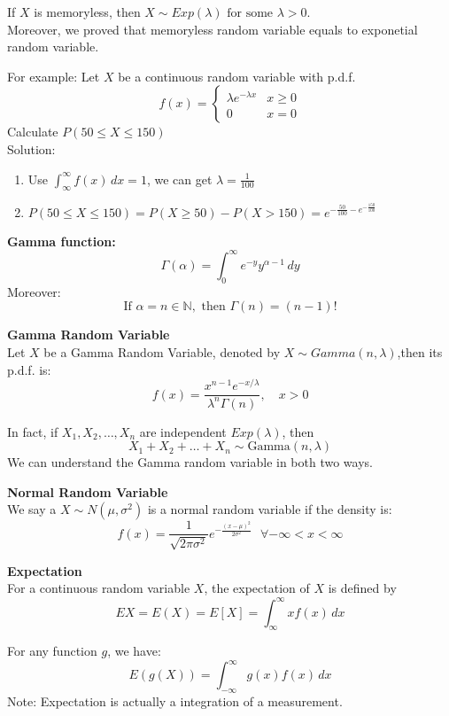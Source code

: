 \documentclass{article}
\begin{document}
\begin{theorem}
    If $X$ is memoryless, then $X \sim Exp(\lambda) \text{ for some } \lambda > 0$. \\
    Moreover, we proved that memoryless random variable equals to exponetial random variable.
\end{theorem}
For example: Let $X$ be a continuous random variable with p.d.f.
\[ 
f(x) =
\begin{cases}
    \lambda e^{-\lambda x} & x \geq 0 \\
    0 & x = 0
\end{cases}
\]
Calculate $P(50 \leq X \leq 150)$ \\
Solution:
\begin{enumerate}
    \item Use $\int^{\infty}_{\infty}f(x) \, dx = 1$, we can get $\lambda = \frac{1}{100}$
    \item $P(50 \leq X \leq 150) = P(X \geq 50) - P(X > 150) = e^{-\frac{50}{100} - e^{-\frac{150}{100}}}$
\end{enumerate}
\begin{definition}
    \textbf{Gamma function:}
    $$ \Gamma(\alpha) = \int^{\infty}_0 e^{-y}y^{\alpha-1}\, dy$$
    Moreover:
    $$ \text{If } \alpha = n \in \mathbb{N}, \text{ then } \Gamma(n) = (n-1)!$$
\end{definition}

\begin{definition}
    \textbf{Gamma Random Variable}\\
    Let $X$ be a Gamma Random Variable, denoted by $X \sim Gamma(n,\lambda)$,then its p.d.f. is:
    $$ f(x) = \frac{x^{n-1} e^{-x/\lambda}}{\lambda^n \Gamma(n)}, \quad x > 0$$
\end{definition}
In fact, if $X_1, X_2, \dots ,X_n$ are independent $Exp(\lambda)$, then
$$ X_1 + X_2 + \dots + X_n \sim \text{Gamma}(n, \lambda)$$
We can understand the Gamma random variable in both two ways.
\begin{definition}
    \textbf{Normal Random Variable}\\
    We say a $X \sim N(\mu, \sigma^2)$ is a normal random variable if the density is:
    $$ f(x) = \frac{1}{\sqrt{2\pi\sigma^2}}e^{-\frac{(x-\mu)^2}{2\sigma^2}} \textbf{ } \forall -\infty < x < \infty$$
\end{definition}

\begin{definition}
    \textbf{Expectation}\\
    For a continuous random variable $X$, the expectation of $X$ is defined by
    $$EX = E(X) = E[X] = \int^{\infty}_{\infty} xf(x) \, dx$$
\end{definition}
For any function $g$, we have:
$$ E(g(X)) = \int^{\infty}_{-\infty} g(x)f(x) \, dx$$
Note: Expectation is actually a integration of a measurement.
\end{document}
